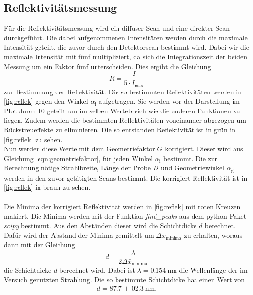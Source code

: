 \subsection{Reflektivitätsmessung}
Für die Reflektivitätsmessung wird ein diffuser Scan und eine direkter Scan durchgeführt.
Die dabei aufgenommenen Intensitäten werden durch die maximale Intensität geteilt, die zuvor durch den Detektorscan bestimmt wird.
Dabei wir die maximale Intensität mit fünf multipliziert, da sich die Integrationszeit der beiden Messung um ein Faktor fünf unterscheiden.
Dies ergibt die Gleichung 
\begin{equation*}
    R = \frac{I}{5\cdot I_\text{max}}
\end{equation*} 
zur Bestimmung der Reflektivität.
Die so bestimmten Reflektivitäten werden in \autoref{fig:reflek} gegen den Winkel $\alpha_\text{i}$ aufgetragen.
Sie werden vor der Darstellung im Plot durch 10 geteilt um im selben Wertebreich wie die anderen Funktionen zu liegen.
Zudem werden die bestimmten Reflektivitäten voneinander abgezogen um Rückstreueffekte zu eliminieren.
Die so entstanden Reflektivität ist in grün in \autoref{fig:reflek} zu sehen.
\\
Nun werden diese Werte mit dem Geometriefaktor $G$ korrigiert.
Dieser wird aus Gleichung \eqref{eqn:geometriefaktor}, für jeden Winkel $\alpha_\text{i}$ bestimmt.
Die zur Berechnung nötige Strahlbreite, Länge der Probe $D$ und Geometriewinkel $\alpha_\text{g}$ werden in den zuvor getätigten Scans bestimmt.
Die korrigiert Reflektivität ist in \autoref{fig:reflek} in braun zu sehen.
\\\\
Die Minima der korrigiert Reflektivität werden in \autoref{fig:reflek} mit roten Kreuzen makiert.
Die Minima werden mit der Funktion \textit{find\_peaks} aus dem python Paket \textit{scipy} \cite{scipy} bestimmt.
Aus den Abständen dieser wird die Schichtdicke $d$ berechnet.
Dafür wird der Abstand der Minima gemittelt um $\Delta \bar{x} _\text{minima}$ zu erhalten, woraus dann mit der Gleichung
\begin{equation*}
    d = \frac{\lambda}{2\Delta \bar{x} _\text{minima}}
\end{equation*}
die Schichtdicke $d$ berechnet wird.
Dabei ist $\lambda = \SI{0.154}{\nano\meter}$ die Wellenlänge der im Versuch genutzten Strahlung.
Die so bestimmte Schichtdicke hat einen Wert von
\begin{align*}
    d = \SI{87.7(023)}{\nano\meter}.
\end{align*}


